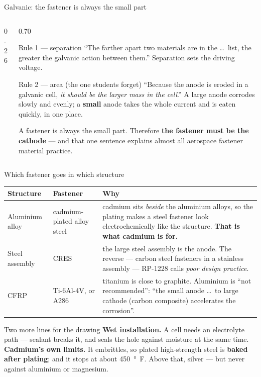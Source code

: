 \documentclass[aspectratio=169,10pt]{beamer}
\begin{document}
\begin{frame}{Galvanic: the fastener is always the small part}
\begin{columns}[T]
\begin{column}{0.26\textwidth}
\centering
\resizebox{!}{5.6cm}{}
\end{column}
\begin{column}{0.70\textwidth}
\begin{block}{Rule 1 --- separation}
``The farther apart two materials are in the \dots\ list, the greater the galvanic action between
them.'' Separation sets the driving voltage.
\end{block}
\begin{alertblock}{Rule 2 --- area (the one students forget)}
``Because the anode is eroded in a galvanic cell, \emph{it should be the larger mass in the cell}.''
\vspace{2pt}
A large anode corrodes slowly and evenly; a \textbf{small} anode takes the whole current and is
eaten quickly, in one place.
\end{alertblock}
\vspace{2pt}
{\footnotesize A fastener is always the small part. Therefore \textbf{the fastener must be the
cathode} --- and that one sentence explains almost all aerospace fastener material practice.}
\end{column}
\end{columns}
\end{frame}

\begin{frame}{Which fastener goes in which structure}
\centering\footnotesize
\begin{tabular}{@{}p{2.3cm}p{2.9cm}p{7.6cm}@{}}
\toprule
Structure & Fastener & Why\\
\midrule
Aluminium alloy & cadmium-plated alloy steel & cadmium sits \emph{beside} the aluminium alloys, so
the plating makes a steel fastener look electrochemically like the structure. \textbf{That is what
cadmium is for.}\\[2pt]
Steel assembly & CRES & the large steel assembly is the anode. The reverse --- carbon steel
fasteners in a stainless assembly --- RP-1228 calls \emph{poor design practice}.\\[2pt]
CFRP & Ti-6Al-4V, or A286 & titanium is close to graphite. Aluminium is ``not recommended'':
``the small anode \dots\ to large cathode (carbon composite) accelerates the corrosion''.\\
\bottomrule
\end{tabular}
\vfill
\raggedright
\begin{alertblock}{Two more lines for the drawing}
\textbf{Wet installation.} A cell needs an electrolyte path --- sealant breaks it, and seals the
hole against moisture at the same time.
\vspace{2pt}
\textbf{Cadmium's own limits.} It embrittles, so plated high-strength steel is \textbf{baked after
plating}; and it stops at about \SI{450}{\degree F}. Above that, silver --- but never against
aluminium or magnesium.
\end{alertblock}
\end{frame}
\end{document}
